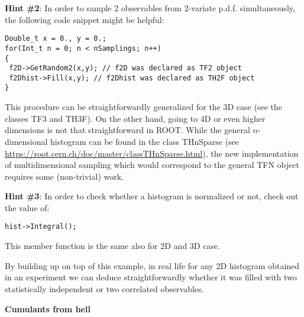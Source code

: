 \documentclass[11pt]{article}
\begin{document}
\bigskip

\noindent\textbf{Hint \#2}: In order to sample 2 observables from 2-variate p.d.f. simultaneously, the following code snippet might be helpful:
{\small
% 
\begin{verbatim}
Double_t x = 0., y = 0.;
for(Int_t n = 0; n < nSamplings; n++)
{
 f2D->GetRandom2(x,y); // f2D was declared as TF2 object
 f2Dhist->Fill(x,y); // f2Dhist was declared as TH2F object
}
\end{verbatim}
%
} %
\noindent This procedure can be straightforwardly generalized for the 3D case (see the classes TF3 and TH3F). On the other hand, going to 4D or even higher dimensions is not that straightforward in ROOT. While the general $n$-dimensional histogram can be found in the class THnSparse (see \url{https://root.cern.ch/doc/master/classTHnSparse.html}), the new implementation of multidimensional sampling which would correspond to the general TFN object requires some (non-trivial) work.

\newpage

\noindent \textbf{{Hint \#3}}: In order to check whether a histogram is normalized or not, check out the value of:
{\small
% 
\begin{verbatim}
hist->Integral();
\end{verbatim}
%
} %
\noindent This member function is the same also for 2D and 3D case.

\bigskip

\noindent By building up on top of this example, in real life for any 2D histogram obtained in an experiment we can deduce straightforwardly whether it was filled with two statistically independent or two correlated observables. 

\bigskip

\begin{center}
\Large{\bf{Cumulants from hell}}\\
\end{center}
\end{document}

